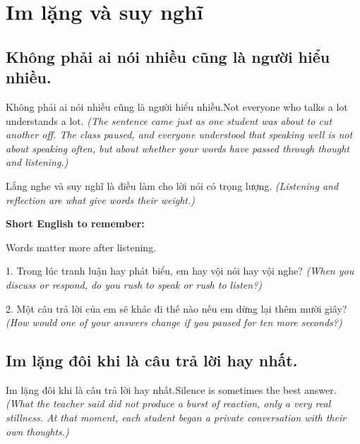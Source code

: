 \chapter{Im lặng và suy nghĩ}

\section{Không phải ai nói nhiều cũng là người hiểu nhiều.}
\begin{truyen}{Không phải ai nói nhiều cũng là người hiểu nhiều.}{Not everyone who talks a lot understands a lot.}
\textit{(The sentence came just as one student was about to cut another off. The class paused, and everyone understood that speaking well is not about speaking often, but about whether your words have passed through thought and listening.)}
\end{truyen}

\begin{baihoc}
Lắng nghe và suy nghĩ là điều làm cho lời nói có trọng lượng.
\textit{(Listening and reflection are what give words their weight.)}
\end{baihoc}

\begin{ghinhoanh}
\textbf{Short English to remember:}

Words matter more after listening.

\end{ghinhoanh}

\begin{tuhocnhanh}
1. Trong lúc tranh luận hay phát biểu, em hay vội nói hay vội nghe? \textit{(When you discuss or respond, do you rush to speak or rush to listen?)}

2. Một câu trả lời của em sẽ khác đi thế nào nếu em dừng lại thêm mười giây? \textit{(How would one of your answers change if you paused for ten more seconds?)}
\end{tuhocnhanh}
\ngancach


\section{Im lặng đôi khi là câu trả lời hay nhất.}
\begin{truyen}{Im lặng đôi khi là câu trả lời hay nhất.}{Silence is sometimes the best answer.}
\textit{(What the teacher said did not produce a burst of reaction, only a very real stillness. At that moment, each student began a private conversation with their own thoughts.)}
\end{truyen}

